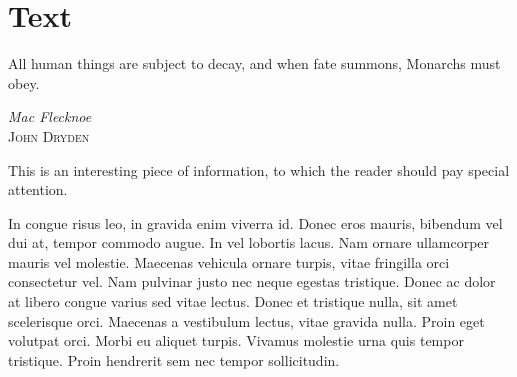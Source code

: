 \chapter{Text}
\label{ch:ch2}

\begin{singlespace} %
	\epigraph{All human things are subject to decay, and when fate summons, Monarchs must obey.}{\textit{Mac Flecknoe} \\ \textsc{John Dryden}}
\end{singlespace}

\begin{notice}
	This is an interesting piece of information, to which the reader should pay special attention.
\end{notice}

\lipsum[6-7]

\begin{highlight}[Problem 1]
	In congue risus leo, in gravida enim viverra id. Donec eros mauris, bibendum vel dui at, tempor commodo augue. In vel lobortis lacus. Nam ornare ullamcorper mauris vel molestie. Maecenas vehicula ornare turpis, vitae fringilla orci consectetur vel. Nam pulvinar justo nec neque egestas tristique. Donec ac dolor at libero congue varius sed vitae lectus. Donec et tristique nulla, sit amet scelerisque orci. Maecenas a vestibulum lectus, vitae gravida nulla. Proin eget volutpat orci. Morbi eu aliquet turpis. Vivamus molestie urna quis tempor tristique. Proin hendrerit sem nec tempor sollicitudin.
\end{highlight}